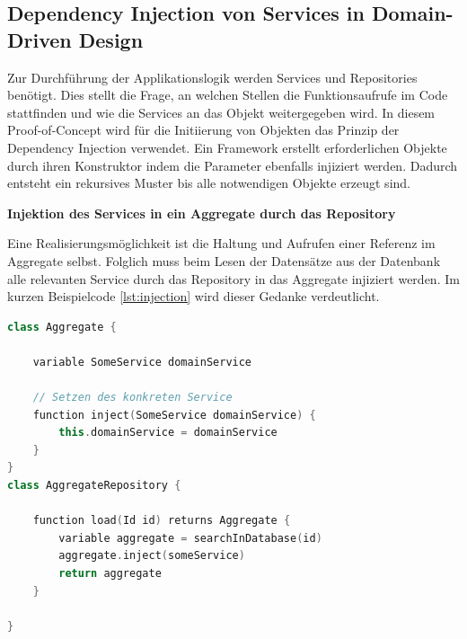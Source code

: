\subsection{Dependency Injection von Services in Domain-Driven Design}

Zur Durchführung der Applikationslogik werden Services und Repositories benötigt. Dies stellt die Frage, an welchen Stellen die Funktionsaufrufe im Code stattfinden und wie die Services an das Objekt weitergegeben wird. In diesem Proof-of-Concept wird für die Initiierung von Objekten das Prinzip der Dependency Injection verwendet. Ein Framework erstellt erforderlichen Objekte durch ihren Konstruktor indem die Parameter ebenfalls injiziert werden. Dadurch entsteht ein rekursives Muster bis alle notwendigen Objekte erzeugt sind.

\textbf{Injektion des Services in ein Aggregate durch das Repository}

Eine Realisierungsmöglichkeit ist die Haltung und Aufrufen einer Referenz im Aggregate selbst. Folglich muss beim Lesen der Datensätze aus der Datenbank alle relevanten Service durch das Repository in das Aggregate injiziert werden. Im kurzen Beispielcode \ref{lst:injection} wird dieser Gedanke verdeutlicht.

\begin{minipage}{\linewidth} %
	\begin{lstlisting}[caption={Injektion des Services in ein Aggregate durch das Repository}, label={lst:injection}, language=Kotlin]
class Aggregate {
	
	variable SomeService domainService
	
	// Setzen des konkreten Service
	function inject(SomeService domainService) {
		this.domainService = domainService
	}
}
class AggregateRepository {
	
	function load(Id id) returns Aggregate {
		variable aggregate = searchInDatabase(id)
		aggregate.inject(someService)
		return aggregate
	}
	
}
	\end{lstlisting}
\end{minipage}

